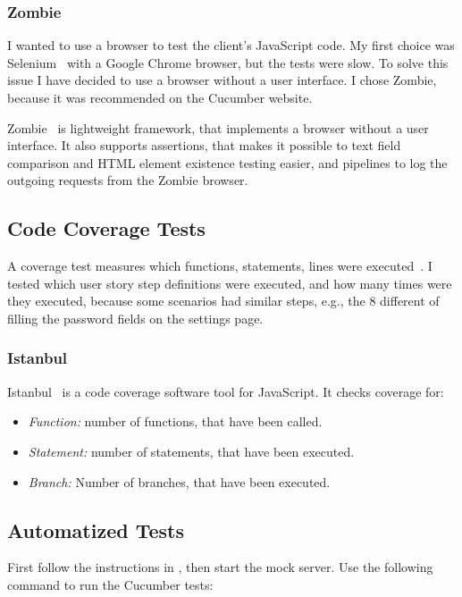 \subsubsection{Zombie}
I wanted to use a browser to test the client's JavaScript code. My first choice was Selenium~\cite{selenium} with a Google Chrome browser, but the tests were slow. To solve this issue I have decided to use a browser without a user interface. I chose Zombie, because it was recommended on the Cucumber website.

Zombie~\cite{zombie} is lightweight framework, that implements a browser without a user interface. It also supports assertions, that makes it possible to text field comparison and HTML element existence testing easier, and pipelines to log the outgoing requests from the Zombie browser. 

\subsection{Code Coverage Tests}
A coverage test measures which functions, statements, lines were executed~\cite{szofttech}. I tested which user story step definitions were executed, and how many times were they executed, because some scenarios had similar steps, e.g., the 8 different of filling the password fields on the settings page.

\subsubsection{Istanbul}
Istanbul~\cite{istanbul} is a code coverage software tool for JavaScript. It checks coverage for:

\begin{itemize}
	\item \emph{Function:} number of functions, that have been called.
	\item \emph{Statement:} number of statements, that have been executed.
	\item \emph{Branch:} Number of branches, that have been executed.
\end{itemize}

\subsection{Automatized Tests}
First follow the instructions in , then start the mock server. Use the following command to run the Cucumber tests:


